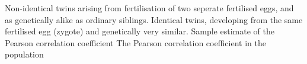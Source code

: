 % 
% 
%

 Non-identical twins arising from fertilisation of two seperate fertilised eggs, and as genetically alike as ordinary siblings.
 Identical twins, developing from the same fertilised egg (zygote) and genetically very similar.
 Sample estimate of the Pearson correlation coefficient
\runinhead{$\rho$} The Pearson correlation coefficient in the population
